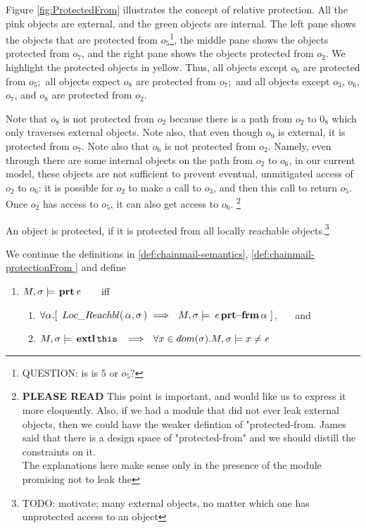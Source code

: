  
Figure \ref{fig:ProtectedFrom} illustrates the concept of relative protection. All the pink objects are external, and the green objects are internal. The left pane shows the objects that are protected from $o_5$\footnote{QUESTION: is is $5$ or $o_5$?}, the middle pane shows the objects protected from $o_7$, and the right pane shows the objects protected from $o_2$. We highlight the protected objects in yellow. Thus, all objects except $o_6$ are protected from $o_5$;\ all objects expect $o_8$ are protected from $o_7$;\ and all objects except $o_3$, $o_6$, $o_7$, and $o_8$ are protected from $o_2$. 

Note that $o_8$ is not protected from $o_2$ because there is a path from $o_2$ to $0_8$ which only traverses external objects. Note also, that even though $o_9$ is external, it is protected from $o_7$.
Note also that $o_6$ is not protected from $o_2$. Namely, even through there are some internal objects on the path from $o_2$ to $o_6$, in our current model, these objects are not sufficient to prevent eventual, unmitigated access of $o_2$ to $o_6$: it is possible for $o_2$ to make a call to $o_3$, and then this call to return $o_5$. Once $o_2$ has access to $o_5$, it can also get access to $o_6$. 
\footnote{\textbf{PLEASE READ} This point is important, and would like us to express it more eloquently. Also, if we had a module that did not ever leak external objects, then we could have the weaker defintion of "protected-from. James said that there is a design space of "protected-from" and we should distill the constraints on it.\\
The explanations here make sense only in the presence of the module promising not to leak the }

\vspace{.1in}

An object is protected, if it is protected from all locally reachable objects.\footnote{TODO: motivate; many external objects, no matter which one has unprotected access to an object }
\begin{definition} 
\label{def:chainmail-protection}
We continue the definitions in \ref{def:chainmail-semantics}, \ref{def:chainmail-protectionFrom } and  define   
\begin{enumerate}
\item
$M , \sigma \models {\ensuremath{\, \mathbf{prt}}\, \mathit{e}\, }$  \ \ \ iff \ \ \ 
\begin{enumerate}
\item
{$\forall \alpha.[ \  \LRelevant {\alpha}  {\sigma}\ \Longrightarrow \ \  \satisfiesA{M}{\sigma}{\protectedFrom{\re} {{\alpha}}}\ ] $}, \ \ \ and 
\item
$\satisfiesA{M}{\sigma}{\external{\prg{this}}}\ \ \Longrightarrow\ \ \forall x\in dom(\sigma).\satisfiesA{M}{\sigma}{x\neq \re}$
\end{enumerate}
\end{enumerate}
\end{definition}
 
